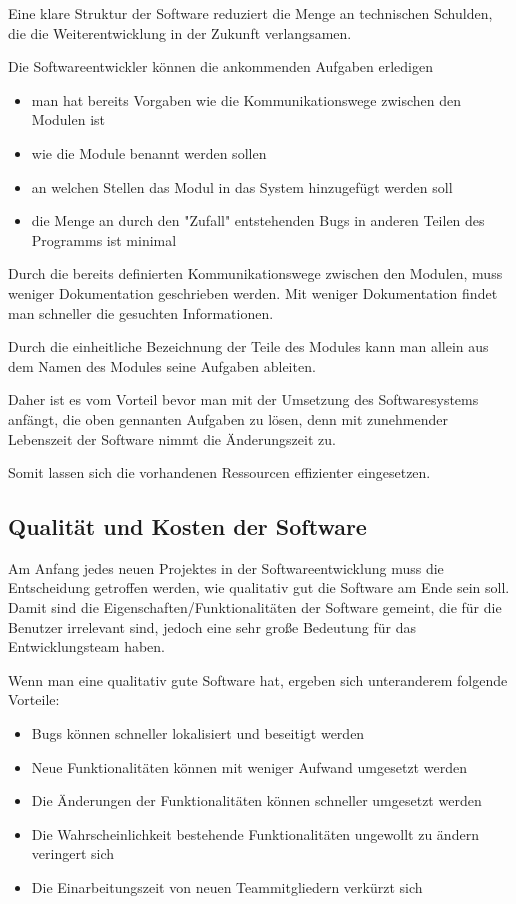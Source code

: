 \documentclass{article}
\begin{document}
    Eine klare Struktur der Software reduziert die Menge an technischen Schulden, 
    die die Weiterentwicklung in der Zukunft verlangsamen. 

    Die Softwareentwickler können die ankommenden Aufgaben erledigen
    \begin{itemize}
        \item man hat bereits Vorgaben wie die Kommunikationswege zwischen den Modulen ist
        \item wie die Module benannt werden sollen
        \item an welchen Stellen das Modul in das System hinzugefügt werden soll
        \item die Menge an durch den "Zufall" entstehenden Bugs in anderen Teilen des Programms ist minimal
    \end{itemize}

    Durch die bereits definierten Kommunikationswege zwischen den Modulen, muss weniger Dokumentation geschrieben werden.
    Mit weniger Dokumentation findet man schneller die gesuchten Informationen.

    Durch die einheitliche Bezeichnung der Teile des Modules kann man allein aus dem Namen des Modules seine Aufgaben ableiten.

    Daher ist es vom Vorteil bevor man mit der Umsetzung des Softwaresystems anfängt, die oben gennanten Aufgaben zu lösen,
    denn mit zunehmender Lebenszeit der Software nimmt die Änderungszeit zu.

    Somit lassen sich die vorhandenen Ressourcen effizienter eingesetzen.

    \newpage
    \subsection{Qualität und Kosten der Software}
    \nocite{MF_isHighQuilatySoftwareWorthTheCost}

    Am Anfang jedes neuen Projektes in der Softwareentwicklung muss die Entscheidung getroffen werden, wie qualitativ gut die Software am Ende sein soll.
    Damit sind die Eigenschaften/Funktionalitäten der Software gemeint, die für die Benutzer irrelevant sind, jedoch eine sehr große Bedeutung 
    für das Entwicklungsteam haben.
    
    Wenn man eine qualitativ gute Software hat, ergeben sich unteranderem folgende Vorteile:
    \begin{itemize}
        \item Bugs können schneller lokalisiert und beseitigt werden
        \item Neue Funktionalitäten können mit weniger Aufwand umgesetzt werden
        \item Die Änderungen der Funktionalitäten können schneller umgesetzt werden
        \item Die Wahrscheinlichkeit bestehende Funktionalitäten ungewollt zu ändern veringert sich
        \item Die Einarbeitungszeit von neuen Teammitgliedern verkürzt sich 
    \end{itemize}
\end{document}
